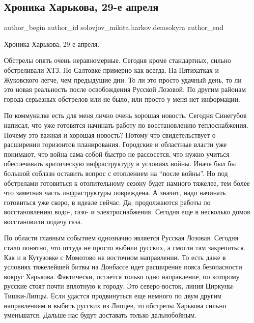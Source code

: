  
 
 
 
 
 
\subsection{Хроника Харькова, 29-е апреля}
\label{sec:29_04_2022.fb.solovjov_mikita.harkov.demsokyra.1.hronika}
 
\ifcmt
 author_begin
   author_id solovjov_mikita.harkov.demsokyra
 author_end
\fi

Хроника Харькова, 29-е апреля. 

Обстрелы опять очень неравномерные. Сегодня кроме стандартных, сильно
обстреливали ХТЗ. По Салтовке примерно как всегда. На Пятихатках и Жуковского
легче, чем предыдущие дни. То ли это просто удачный день, то ли это новая
реальность после освобождения Русской Лозовой. По другим районам города
серьезных обстрелов или не было, или просто у меня нет информации. 

По коммуналке есть для меня лично очень хорошая новость. Сегодня Синегубов
написал, что уже готовятся начинать работу по восстановлению теплоснабжения.
Почему это важная и хорошая новость? Потому что свидетельствует о расширении
горизонтов планирования. Городские и областные власти уже понимают, что война
сама собой быстро не рассосется, что нужно учиться обеспечивать критическую
инфраструктуру в условиях войны. Иначе был бы большой соблазн оставить вопрос с
отоплением на \enquote{после войны}. Но под обстрелами готовиться к отопительному
сезону будет намного тяжелее, тем более что заметная часть инфраструктуры
повреждена. А значит, надо начинать готовиться уже скоро, в идеале сейчас. Да,
продолжаются работы по восстановлению водо-, газо- и электроснабжения. Сегодня
еще в несколько домов восстановили подачу газа. 

По области главным событием однозначно является Русская Лозовая. Сегодня стало
понятно, что оттуда не просто выбили русских, а смогли там закрепиться. Как и в
Кутузовке с Момотово на восточном направлении. То есть даже в условиях
тяжелейшей битвы на Донбассе идет расширение пояса безопасности вокруг
Харькова. Фактически, остается только одно направление, по которому русские
стоят почти вплотную к городу. Это северо-восток, линия Циркуны-Тишки-Липцы.
Если удастся продвинуться еще немного по двум другим направлениям и выбить
русских из Липцев, то обстрелы Харькова сильно уменьшатся. Дальше нас будут
доставать только дальнобойным. 

